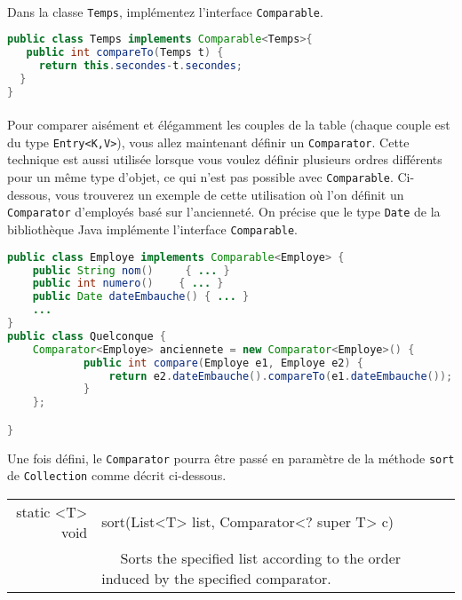 \documentclass[iutinfo,a4paper,nocorrections,10pt]{ustl-tdtp}
\begin{document}
~\\ \question 
Dans la classe \texttt{Temps}, implémentez l'interface \texttt{Comparable}.


\begin{correction}
{\color{red}
\begin{lstlisting}[language=Java]
public class Temps implements Comparable<Temps>{
   public int compareTo(Temps t) {
     return this.secondes-t.secondes;
  }
}
\end{lstlisting}

}
\end{correction}

\paragraph{}Pour comparer aisément et élégamment les couples de la table (chaque couple est du type \texttt{Entry<K,V>}), vous allez maintenant définir un \texttt{Comparator}. Cette technique est aussi utilisée lorsque vous voulez définir plusieurs ordres différents pour un même type d'objet, ce qui n'est pas possible avec \texttt{Comparable}. Ci-dessous, vous trouverez un exemple de cette utilisation où l'on définit un \texttt{Comparator} d'employés basé sur l'ancienneté. On précise que le type \texttt{Date} de la bibliothèque Java implémente l'interface \texttt{Comparable}.
\begin{lstlisting}[language=Java]
public class Employe implements Comparable<Employe> {
    public String nom()     { ... }
    public int numero()    { ... }
    public Date dateEmbauche() { ... }
    ...
}
public class Quelconque {
    Comparator<Employe> anciennete = new Comparator<Employe>() {
            public int compare(Employe e1, Employe e2) {
                return e2.dateEmbauche().compareTo(e1.dateEmbauche());
            }
    };

}
\end{lstlisting}



Une fois défini, le \texttt{Comparator} pourra être passé en paramètre de la méthode \texttt{sort} de \texttt{Collection} comme décrit ci-dessous.

\begin{center}

\begin{tabular}{|r|l|}
\hline
static
<T> void
	& sort(List<T> list, Comparator<? super T> c)  \\
        &~~  
          Sorts the specified list according to the order induced by the specified comparator.\\
 \hline
 
 \end{tabular}
 \end{center}
\end{document}
